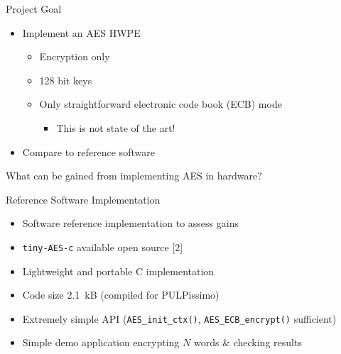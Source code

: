 \documentclass[aspectratio=169, nobackgroundmain]{beamer}
\begin{document}
\begin{frame}[fragile]{Project Goal}
  \begin{itemize}
    \item Implement an AES HWPE \begin{itemize}
      \item Encryption only
      \item 128 bit keys
      \item Only straightforward electronic code book (ECB) mode \begin{itemize}
        \item This is not state of the art!
      \end{itemize}
    \end{itemize} 
    \item Compare to reference software
\end{itemize}

\begin{block}{}
    \centering
   What can be gained from implementing AES in hardware?
\end{block}
\end{frame}

\begin{frame}[fragile]{Reference Software Implementation}

  \begin{itemize}
      \item Software reference implementation to assess gains
      \item \verb|tiny-AES-c| available open source [2]
      \item Lightweight and portable C implementation
      \item Code size \SI{2.1}{kB} (compiled for PULPissimo)
      \item Extremely simple API (\verb|AES_init_ctx()|, \verb|AES_ECB_encrypt()| sufficient)
      \item Simple demo application encrypting $N$ words \& checking results
  \end{itemize}
  
\end{frame}
\end{document}
